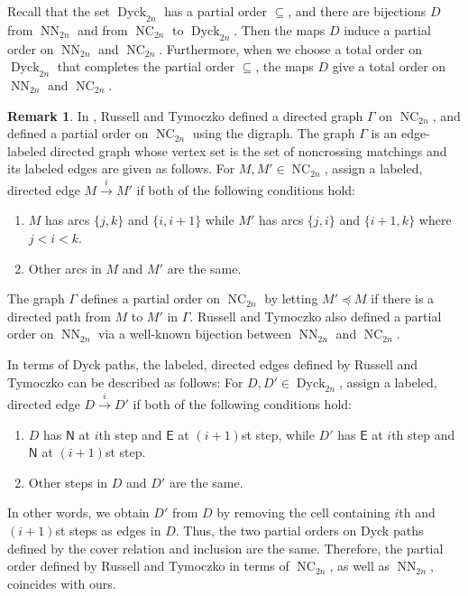 \documentclass[reqno,12pt]{amsart}
\theoremstyle{definition}
\newtheorem{rmk}[thm]{Remark}
\theoremstyle{remark}
\newcommand\Dyck{\operatorname{Dyck}}
\newcommand\NC{\operatorname{NC}}
\newcommand\NN{\operatorname{NN}}
\newcommand\NS{\mathsf{N}}
\newcommand\ES{\mathsf{E}}
\begin{document}
Recall that the set \( \Dyck_{2n} \) has a partial order \( \subseteq \),
and there are bijections \( D \) from \( \NN_{2n} \) and from \( \NC_{2n} \) to
\( \Dyck_{2n} \).
Then the maps \( D \) induce a partial order on \( \NN_{2n} \) and \( \NC_{2n} \).
Furthermore, when we choose a total order on \( \Dyck_{2n} \) that completes
the partial order \( \subseteq \), the maps \( D \) give a total order
on \( \NN_{2n} \) and \( \NC_{2n} \).

\begin{rmk}
  In \cite{RT19}, Russell and Tymoczko defined a directed graph \( \Gamma \) on
  \( \NC_{2n} \), and defined a partial order on \( \NC_{2n} \) using the digraph.
  The graph \( \Gamma \) is an edge-labeled directed graph whose vertex set is
  the set of noncrossing matchings and its labeled edges are given as follows.
  For \( M,M'\in\NC_{2n} \), assign a labeled, directed edge $M \xrightarrow{i} M'$ if both of the following conditions hold:
  \begin{enumerate}[label=\roman*)]
    \item $M$ has arcs $\{j,k\}$ and $\{i,i+1\}$ while $M'$ has arcs $\{j,i\}$ and
    $\{i+1,k\}$ where \( j<i<k \).
    \item Other arcs in $M$ and $M'$ are the same.
  \end{enumerate}
  The graph $\Gamma$ defines a partial order on $\NC_{2n}$ by letting
  \(M'\preceq M\) if there is a directed path from $M$ to $M'$ in \(\Gamma\).
  Russell and Tymoczko also defined a partial order on \(\NN_{2n}\)
  via a well-known bijection between \( \NN_{2n} \) and \( \NC_{2n} \).

  In terms of Dyck paths, the labeled, directed edges defined by Russell and Tymoczko can be described as follows:
  For \( D,D'\in \Dyck_{2n} \), assign a labeled, directed edge \( D \xrightarrow{i} D' \) if both of the following conditions hold:
  \begin{enumerate}[label=\roman*)]
    \item \( D \) has \( \NS \) at \( i \)th step and \( \ES \) at \( (i+1) \)st step, while \( D' \) has \( \ES \) at \( i \)th step and \( \NS \) at \( (i+1) \)st step.
    \item Other steps in $D$ and $D'$ are the same.
  \end{enumerate}
  In other words, we obtain \( D' \) from \( D \) by removing the cell containing \( i \)th and \( (i+1) \)st steps as edges in \( D \).
  Thus, the two partial orders on Dyck paths defined by the cover relation and
  inclusion are the same.
  Therefore, the partial order defined by Russell and Tymoczko in terms of
  \( \NC_{2n} \), as well as \( \NN_{2n} \), coincides with ours.
\end{rmk}
\end{document}
